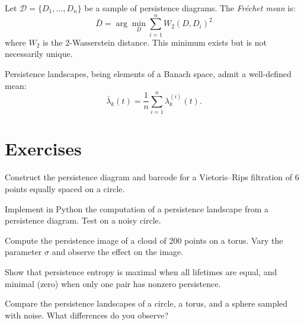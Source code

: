 \begin{theorem}
Let $\mathcal{D} = \{D_1, \ldots, D_n\}$ be a sample of persistence
diagrams. The \emph{Fr\'echet mean} is:
\[
  \bar{D} = \arg\min_{D} \sum_{i=1}^n W_2(D, D_i)^2
\]
where $W_2$ is the $2$-Wasserstein distance. This minimum exists but
is not necessarily unique.
\end{theorem}

\begin{proposition}
Persistence landscapes, being elements of a Banach space, admit a
well-defined mean:
\[
  \bar{\lambda}_k(t) = \frac{1}{n} \sum_{i=1}^n \lambda_k^{(i)}(t).
\]
\end{proposition}

\section{Exercises}

\begin{exercise}
Construct the persistence diagram and barcode for a Vietoris--Rips
filtration of $6$ points equally spaced on a circle.
\end{exercise}

\begin{exercise}
Implement in Python the computation of a persistence landscape from a
persistence diagram. Test on a noisy circle.
\end{exercise}

\begin{exercise}
Compute the persistence image of a cloud of $200$ points on a torus.
Vary the parameter $\sigma$ and observe the effect on the image.
\end{exercise}

\begin{exercise}
Show that persistence entropy is maximal when all lifetimes are equal,
and minimal (zero) when only one pair has nonzero persistence.
\end{exercise}

\begin{exercise}
Compare the persistence landscapes of a circle, a torus, and a sphere
sampled with noise. What differences do you observe?
\end{exercise}
